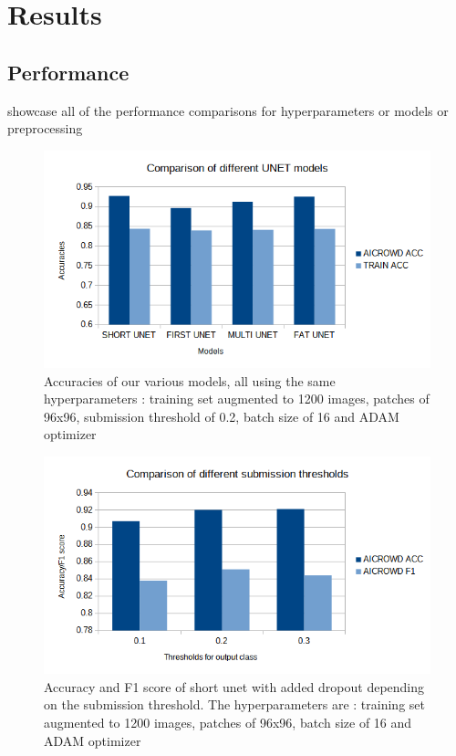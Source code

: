 \documentclass[10pt,conference,compsocconf]{IEEEtran}
\begin{document}
\section{Results}
\subsection{Performance}
showcase all of the performance comparisons for hyperparameters or models or preprocessing
\begin{figure}[H]
    \centering
    \includegraphics[scale = 0.4]{models_graph.png} %
    \caption{Accuracies of our various models, all using the same hyperparameters : training set augmented to 1200 images, patches of 96x96, submission threshold of 0.2, batch size of 16 and ADAM optimizer}
\end{figure}

\begin{figure}[H]
    \centering
    \includegraphics[scale = 0.4]{thresholds_graph.png} %
    \caption{Accuracy and F1 score of short unet with added dropout depending on the submission threshold. The hyperparameters are : training set augmented to 1200 images, patches of 96x96, batch size of 16 and ADAM optimizer}
\end{figure}
\end{document}
